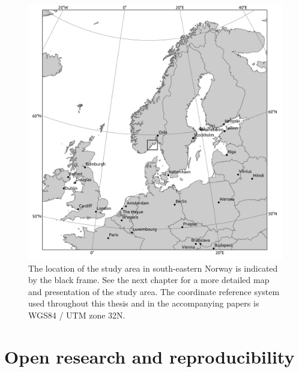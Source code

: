 \documentclass[
  12pt,
  a4paper,
  oneside]{book}
\begin{document}
\begin{figure}

{\centering \includegraphics[width=1\linewidth]{figures/large_overview} 

}

\caption{The location of the study area in south-eastern Norway is indicated by the black frame. See the next chapter for a more detailed map and presentation of the study area. The coordinate reference system used throughout this thesis and in the accompanying papers is WGS84 / UTM zone 32N.}\label{fig:map}
\end{figure}

\hypertarget{open-research-and-reproducibility}{%
\section{Open research and reproducibility}\label{open-research-and-reproducibility}}
\end{document}
